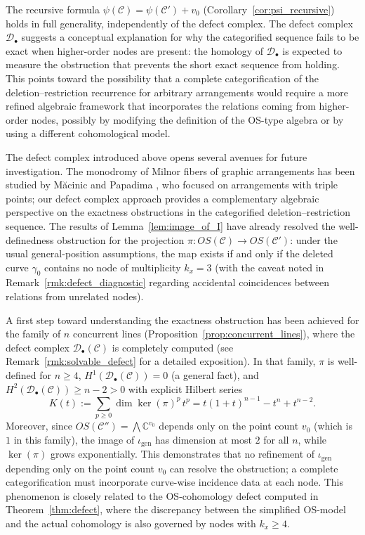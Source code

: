 \documentclass[article,11pt]{amsart} \numberwithin{equation}{section}
\numberwithin{equation}{section}
\begin{document}
{\begin{rk}
	The recursive formula $\psi(\mathcal C) = \psi(\mathcal C') + v_0$ 
	(Corollary~\ref{cor:psi_recursive}) holds in full generality, 
	independently of the defect complex. The defect complex $\mathcal D_\bullet$ 
	suggests a conceptual explanation for why the categorified sequence 
	fails to be exact when higher-order nodes are present: the homology 
	of $\mathcal D_\bullet$ is expected to measure the obstruction that 
	prevents the short exact sequence from holding. This points toward 
	the possibility that a complete categorification of the deletion–restriction 
	recurrence for arbitrary arrangements would require a more refined 
	algebraic framework that incorporates the relations coming from 
	higher-order nodes, possibly by modifying the definition of the 
	OS-type algebra or by using a different cohomological model.
\end{rk}

\begin{rk}
	\label{rmk:future_directions}
The defect complex introduced above opens several avenues for future investigation. The monodromy of Milnor fibers of graphic arrangements has been studied by Măcinic and Papadima \cite{MacinicPapadima2009}, who focused on arrangements with triple points; our defect complex approach provides a complementary algebraic perspective on the exactness obstructions in the categorified deletion--restriction sequence.
	The results of Lemma~\ref{lem:image_of_I} have already resolved the well-definedness 
	obstruction for the projection $\pi:OS(\mathcal C)\longrightarrow OS(\mathcal C')$: under the 
	usual general-position assumptions, the map exists if and only if the deleted curve 
	$\gamma_0$ contains no node of multiplicity $k_x=3$ (with the caveat noted in 
	Remark~\ref{rmk:defect_diagnostic} regarding accidental coincidences between 
	relations from unrelated nodes).
	
	A first step toward understanding the exactness obstruction has been achieved for 
	the family of $n$ concurrent lines (Proposition~\ref{prop:concurrent_lines}), where 
	the defect complex $\mathcal D_\bullet(\mathcal C)$ is completely computed (see 
	Remark~\ref{rmk:solvable_defect} for a detailed exposition). In that 
	family, $\pi$ is well-defined for $n\ge4$, $H^1(\mathcal D_\bullet(\mathcal C))=0$ 
	(a general fact), and $H^2(\mathcal D_\bullet(\mathcal C))\ge n-2>0$ with explicit 
	Hilbert series
	\[
	K(t):=\sum_{p\ge0}\dim\ker(\pi)^p\,t^p
	= t(1+t)^{n-1}-t^n+t^{n-2}.
	\]
	Moreover, since $OS(\mathcal C'')=\bigwedge\mathbb C^{v_0}$ depends only on the 
	point count $v_0$ (which is $1$ in this family), the image of $\iota_{\mathrm{gen}}$ 
	has dimension at most $2$ for all $n$, while $\ker(\pi)$ grows exponentially. This 
	demonstrates that no refinement of $\iota_{\mathrm{gen}}$ depending only on the 
	point count $v_0$ can resolve the obstruction; a complete categorification must 
	incorporate curve-wise incidence data at each node. This phenomenon is closely 
	related to the OS-cohomology defect computed in Theorem~\ref{thm:defect}, where the 
	discrepancy between the simplified OS-model and the actual cohomology is also 
	governed by nodes with $k_x\ge4$.
	

\end{rk}}
\end{document}
